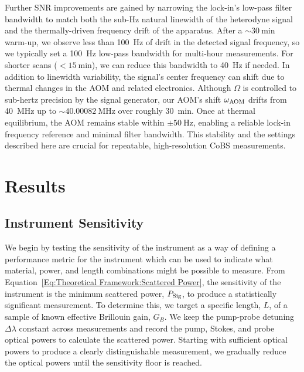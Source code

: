 Further \ac{SNR} improvements are gained by narrowing the lock-in’s low-pass filter bandwidth to match both the sub-\si{\hertz} natural linewidth of the heterodyne signal and the thermally-driven frequency drift of the apparatus. After a \(\sim\!\SI{30}{\minute}\) warm-up, we observe less than \SI{100}{\hertz} of drift in the detected signal frequency, so we typically set a \SI{100}{\hertz} low-pass bandwidth for multi-hour measurements. For shorter scans (\(< \SI{15}{\minute}\)), we can reduce this bandwidth to \SI{40}{\hertz} if needed. In addition to linewidth variability, the signal’s center frequency can shift due to thermal changes in the \ac{AOM} and related electronics. Although \(\Omega\) is controlled to sub-hertz precision by the signal generator, our \ac{AOM}’s shift \(\omega_{\rm AOM}\) drifts from \SI{40}{\mega\hertz} up to \(\sim\!\SI{40.00082}{\mega\hertz}\) over roughly \SI{30}{\minute}. Once at thermal equilibrium, the \ac{AOM} remains stable within \(\pm\SI{50}{\hertz}\), enabling a reliable lock-in frequency reference and minimal filter bandwidth. This stability and the settings described here are crucial for repeatable, high-resolution \ac{CoBS} measurements.

\section{Results}\label{Results}
\subsection{Instrument Sensitivity}
\label{Results:Instrument sensitivity}

We begin by testing the sensitivity of the instrument as a way of defining a performance metric for the instrument which can be used to indicate what material, power, and length combinations might be possible to measure. From Equation~\ref{Eq:Theoretical Framework:Scattered Power}, the sensitivity of the instrument is the minimum scattered power, \(P_{\rm Sig}\), to produce a statistically significant measurement. To determine this, we target a specific length, \(L\), of a sample of known effective Brillouin gain, \(G_B\). We keep the pump-probe detuning \(\Delta\lambda\) constant across measurements and record the pump, Stokes, and probe optical powers to calculate the scattered power. Starting with sufficient optical powers to produce a clearly distinguishable measurement, we gradually reduce the optical powers until the sensitivity floor is reached.

